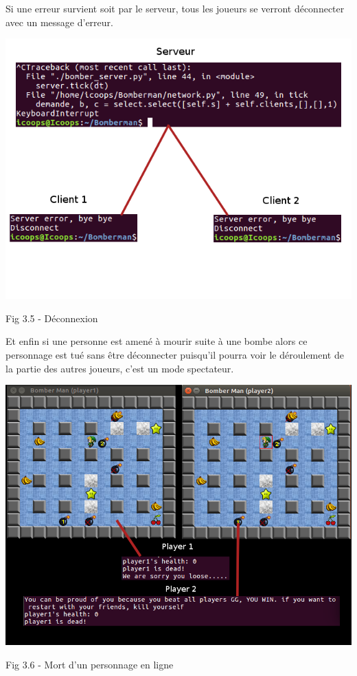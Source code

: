\documentclass[12pt]{article}
\begin{document}
        Si une erreur survient soit par le serveur, tous les joueurs se verront déconnecter avec un message d'erreur.

        \begin{center}
            \includegraphics[scale=0.5]{deco_server.png}
        \end{center}
        \begin{center}
            \caption{Fig 3.5 - Déconnexion}
        \end{center}

        Et enfin si une personne est amené à mourir suite à une bombe alors ce personnage est tué sans être déconnecter puisqu’il pourra voir le déroulement de la partie des autres joueurs, c'est un mode spectateur.
        \begin{center}
            \includegraphics[scale=0.5]{mort.png}
        \end{center}
        \begin{center}
            \caption{Fig 3.6 - Mort d'un personnage en ligne}
        \end{center}
\end{document}
